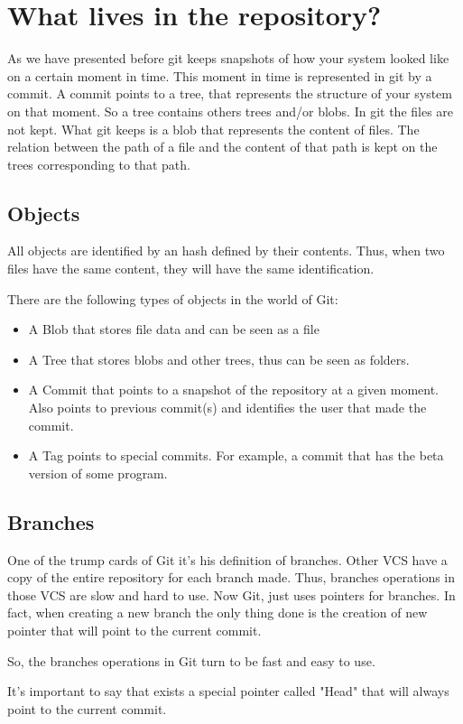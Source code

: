 \section{What lives in the repository?}

As we have presented before git keeps snapshots of how your system
looked like on a certain moment in time. This moment in time is
represented in git by a commit. A commit points to a tree, that
represents the structure of your system on that moment. So a tree
contains others trees and/or blobs. In git the files are not kept. 
What git keeps is a blob that represents the content of files. The
relation between the path of a file and the content of that path 
is kept on the trees corresponding to that path. \par

\subsection{Objects}
All objects are identified by an hash 
defined by their contents. Thus, when two files have the same
content, they will have the same identification. \par

There are the following types of objects in the world of Git:

\begin{itemize}
\item A Blob that stores file data and can be seen as a file
\item A Tree that stores blobs and other trees, thus can be seen as folders.
\item A Commit that points to a snapshot of the repository at a given moment.
Also points to previous commit(s) and identifies the user that made the commit.
\item A Tag points to special commits. For example, a commit that has the beta
version of some program.
\end{itemize}

\subsection{Branches}
One of the trump cards of Git it's his definition of branches. Other VCS
have a copy of the entire repository for each branch made. Thus, branches
operations in those VCS are slow and hard to use. Now Git, just uses 
pointers for branches. In fact, when creating a new branch the only thing
done is the creation of new pointer that will point to the current commit. \par
So, the branches operations in Git turn to be fast and easy to use. \par
It's important to say that exists a special pointer called "Head" that will 
always point to the current commit. \par

